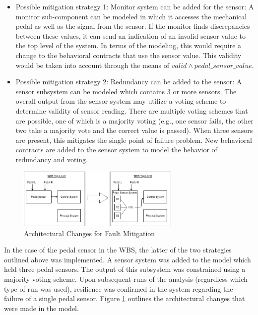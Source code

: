 \begin{itemize}
\item Possible mitigation strategy 1: Monitor system can be added for the sensor: A monitor sub-component can be modeled in which it accesses the mechanical pedal as well as the signal from the sensor. If the monitor finds discrepancies between these values, it can send an indication of an invalid sensor value to the top level of the system. In terms of the modeling, this would require a change to the behavioral contracts that use the sensor value. This validity would be taken into account through the means of $valid \land pedal\_sensor\_value$. 

\item Possible mitigation strategy 2: Redundancy can be added to the sensor: A sensor subsystem can be modeled which contains 3 or more sensors. The overall output from the sensor system may utilize a voting scheme to determine validity of sensor reading. There are multiple voting schemes that are possible, one of which is a majority voting (e.g., one sensor fails, the other two take a majority vote and the correct value is passed). 
When three sensors are present, this mitigates the single point of failure problem. New behavioral contracts are added to the sensor system to model the behavior of redundancy and voting. 
\end{itemize}
\begin{figure}[htbp]
	\begin{center}
		\includegraphics[width=0.7\textwidth]{images/sensorsystem.png}
	\end{center}
	\vspace{-0.3in}
	\caption{Architectural Changes for Fault Mitigation}
	\label{fig:sensorsystem}
\end{figure}
In the case of the pedal sensor in the WBS, the latter of the two strategies outlined above was implemented. A sensor system was added to the model which held three pedal sensors. The output of this subsystem was constrained using a majority voting scheme. Upon subsequent runs of the analysis (regardless which type of run was used), resilience was confirmed in the system regarding the failure of a single pedal sensor. Figure \ref{fig:sensorsystem} outlines the architectural changes that were made in the model.

